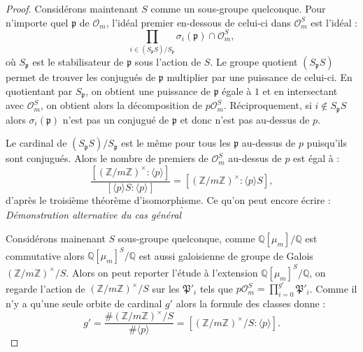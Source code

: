 \documentclass[a4paper]{article} %
\numberwithin{section}{part}
\numberwithin{equation}{section}
\newcommand\zmodninv[1]{(\mathbb{Z}/#1\mathbb{Z})^{\times}}
\newcommand\QQ{\mathbb{Q}}
\newcommand\EO{\mathcal{O}}
\newcommand\groupgen[1]{\langle{#1}\rangle}
\begin{document}
\begin{proof}
Considérons maintenant $S$ comme un sous-groupe quelconque. Pour n'importe quel
$\mathfrak{p}$ de $\EO_m$, l'idéal premier en-dessous de celui-ci dans $\EO_m^S$
est l'idéal :
\begin{equation}
\prod_{i\in\left(S_{\mathfrak{p}}S\right)/S_{\mathfrak{p}}}
{\sigma_i(\mathfrak{p})\cap\EO_m^S},
\end{equation}
où $S_{\mathfrak{p}}$ est le stabilisateur de $\mathfrak{p}$ sous l'action de
$S$. Le groupe quotient $(S_{\mathfrak{p}}S)$ permet de trouver les conjugués de
$\mathfrak{p}$ multiplier par une puissance de celui-ci. En quotientant par
$S_{\mathfrak{p}}$, on obtient une puissance de $\mathfrak{p}$ égale à $1$ et en
intersectant avec $\EO_m^S$, on obtient alors la décomposition de $p\EO_m^S$.
Réciproquement, si $i\notin S_{\mathfrak{p}}S$ alors $\sigma_i(\mathfrak{p})$ 
n'est pas un conjugué de $\mathfrak{p}$ et donc n'est pas au-dessus de $p$.\par
Le cardinal de $(S_{\mathfrak{p}}S)/S_{\mathfrak{p}}$ est le même pour tous les
$\mathfrak{p}$ au-dessus de $p$ puisqu'ils sont conjugués. Alors le nombre de
premiers de $\EO_m^S$ au-dessus de $p$ est égal à :
\begin{equation}
\dfrac{[\zmodninv{m}:\groupgen{p}]}{[\groupgen{p}S:\groupgen{p}]} =
[\zmodninv{m}:\groupgen{p}S],
\end{equation}
d'après le troisième théorème d'isomorphisme. Ce qu'on peut encore écrire
:
\begin{equation}
[\zmodninv{m}/S:\groupgen{p}].
\end{equation}
\vspace{0.3cm}
\emph{Démonstration alternative du cas général}\par
Considérons mainenant $S$ sous-groupe quelconque, comme $\QQ[\mu_m]/\QQ$ est 
commutative alors $\QQ[\mu_m]^S/\QQ$ est aussi galoisienne de groupe de Galois 
$\zmodninv{m}/S$. Alors on peut reporter l'étude à l'extension 
$\QQ[\mu_m]^S/\QQ$, on regarde l'action de $\zmodninv{m}/S$ sur les
$\mathfrak{P}'_i$ tels que $p\EO_m^S = \prod_{i=0}^{g'}{\mathfrak{P}'_i}$. Comme
il n'y a qu'une seule orbite de cardinal $g'$ alors la formule des classes
donne :
\begin{equation}
g' = \frac{\#\zmodninv{m}/S}{\#\groupgen{p}} = 
[\zmodninv{m}/S:\groupgen{p}].
\end{equation}
\end{proof}
\end{document}
